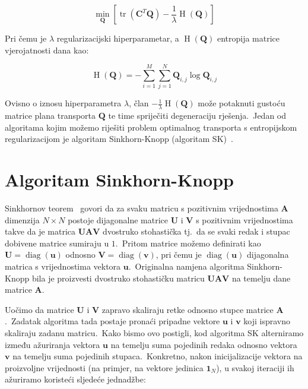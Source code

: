 \documentclass[diplomskirad]{fer}
\begin{document}
\begin{equation}
  \min_{\bm{Q}} \left[ \operatorname{tr}(\bm{C}^T \bm{Q}) - \frac{1}{\lambda} \operatorname{H}(\bm{Q}) \right]
  \label{eq:ot_with_entropy}
\end{equation}

Pri čemu je $\lambda$ regularizacijski hiperparametar, a $\operatorname{H}(\bm{Q})$ entropija matrice vjerojatnosti dana kao:

\begin{equation}
  \operatorname{H}(\bm{Q}) = -\sum_{i = 1}^{M} \sum_{j = 1}^{N} \bm{Q}_{i,j} \log \bm{Q}_{i,j}
  \label{eq:matrix_entropy}
\end{equation}

Ovisno o iznosu hiperparametra $\lambda$, član $- \frac{1}{\lambda} \operatorname{H}(\bm{Q})$ može potaknuti gustoću matrice plana transporta $\bm{Q}$ te time spriječiti degeneraciju rješenja.\
Jedan od algoritama kojim možemo riješiti problem optimalnog transporta s entropijskom regularizacijom je algoritam Sinkhorn-Knopp (algoritam SK)~\cite{knight2008sinkhorn}.\ 

\section{Algoritam Sinkhorn-Knopp}
\label{sek:sk_alg}

Sinkhornov teorem~\cite{sinkhorn1964relationship} govori da za svaku matricu s pozitivnim vrijednostima $\bm{A}$ dimenzija $N \times N$ postoje dijagonalne matrice $\bm{U}$ i $\bm{V}$ s pozitivnim vrijednostima takve da je matrica $\bm{U} \bm{A} \bm{V}$ dvostruko stohastička tj.\ da se svaki redak i stupac dobivene matrice sumiraju u $1$.\ 
Pritom matrice možemo definirati kao $\bm{U} = \operatorname{diag}(\bm{u})$ odnosno $\bm{V} = \operatorname{diag}(\bm{v})$, pri čemu je $\operatorname{diag}(\bm{u})$ dijagonalna matrica s vrijednostima vektora $\bm{u}$.\ 
Originalna namjena algoritma Sinkhorn-Knopp bila je proizvesti dvostruko stohastičku matricu $\bm{U} \bm{A} \bm{V}$ na temelju dane matrice $\bm{A}$.\ 
  
Uočimo da matrice $\bm{U}$ i $\bm{V}$ zapravo skaliraju retke odnosno stupce matrice $\bm{A}$.\ Zadatak algoritma tada postaje pronaći pripadne vektore $\bm{u}$ i $\bm{v}$ koji ispravno skaliraju zadanu matricu.\ 
Kako bismo ovo postigli, kod algoritma SK alterniramo između ažuriranja vektora $\bm{u}$ na temelju suma pojedinih redaka odnosno vektora $\bm{v}$ na temelju suma pojedinih stupaca.\
Konkretno, nakon inicijalizacije vektora na proizvoljne vrijednosti (na primjer, na vektore jedinica $\bm{1}_N$), u svakoj iteraciji ih ažuriramo koristeći sljedeće jednadžbe:
\end{document}
